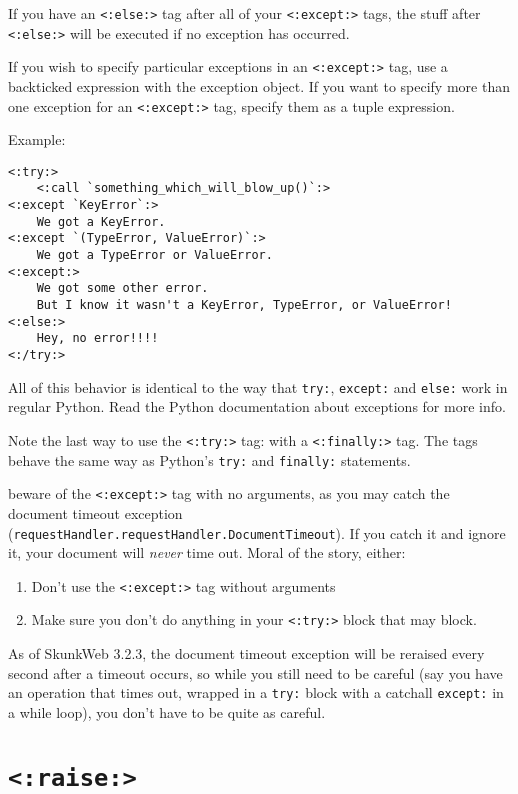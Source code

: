 \documentclass{manual}
\begin{document}
If you have an \texttt{<:else:>} tag after all of your 
\texttt{<:except:>} tags, the stuff after \texttt{<:else:>}
will be executed if no exception has occurred.

If you wish to specify particular exceptions in an
\texttt{<:except:>} tag, use a backticked expression
with the exception object. If you want to specify more than
one exception for an \texttt{<:except:>} tag, specify them
as a tuple expression. 

Example:

\begin{verbatim}
<:try:>
    <:call `something_which_will_blow_up()`:>
<:except `KeyError`:>
    We got a KeyError. 
<:except `(TypeError, ValueError)`:>
    We got a TypeError or ValueError.
<:except:>
    We got some other error. 
    But I know it wasn't a KeyError, TypeError, or ValueError!
<:else:>
    Hey, no error!!!!
<:/try:>
\end{verbatim}

All of this behavior is identical to the way that \texttt{try:},
\texttt{except:} and \texttt{else:} work in regular Python. 
Read the Python documentation about exceptions for more info.

Note the last way to use the \texttt{<:try:>} tag: with
a \texttt{<:finally:>} tag. The tags behave the same
way as Python's \texttt{try:} and \texttt{finally:} statements.

 beware of the \texttt{<:except:>} tag with
no arguments, as you may catch the document timeout exception
(\texttt{requestHandler.requestHandler.DocumentTimeout}).  If you catch
it and ignore it, your document will \emph{never} time out.  Moral of
the story, either:
\begin{enumerate}
\item Don't use the \texttt{<:except:>} tag without arguments
\item Make sure you don't do anything in your \texttt{<:try:>} block
that may block.
\end{enumerate}

 As of SkunkWeb 3.2.3, the document timeout exception
will be reraised every second after a timeout occurs, so while you
still need to be careful (say you have an operation that times out,
wrapped in a \texttt{try:} block with a catchall \texttt{except:} in a
while loop), you don't have to be quite as careful.

\section{\texttt{<:raise:>}}
\label{tagraise}
\end{document}
